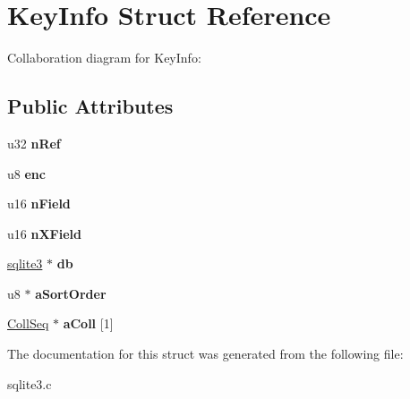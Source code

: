 \hypertarget{structKeyInfo}{}\section{Key\+Info Struct Reference}
\label{structKeyInfo}


Collaboration diagram for Key\+Info\+:
\subsection*{Public Attributes}
\begin{DoxyCompactItemize}
\item 
u32 {\bfseries n\+Ref}\hypertarget{structKeyInfo_a4f6162c8d1ecc9e3c7471571e8918972}{}\label{structKeyInfo_a4f6162c8d1ecc9e3c7471571e8918972}

\item 
u8 {\bfseries enc}\hypertarget{structKeyInfo_a37972825f9a148668e979be12465e832}{}\label{structKeyInfo_a37972825f9a148668e979be12465e832}

\item 
u16 {\bfseries n\+Field}\hypertarget{structKeyInfo_af70436487a95e445d540bfc4ca1d3f0b}{}\label{structKeyInfo_af70436487a95e445d540bfc4ca1d3f0b}

\item 
u16 {\bfseries n\+X\+Field}\hypertarget{structKeyInfo_ac77a6b68f879a69127a8797b62a2f3aa}{}\label{structKeyInfo_ac77a6b68f879a69127a8797b62a2f3aa}

\item 
\hyperlink{structsqlite3}{sqlite3} $\ast$ {\bfseries db}\hypertarget{structKeyInfo_af2e7a3a411f5ca1ccf6de77d320b59db}{}\label{structKeyInfo_af2e7a3a411f5ca1ccf6de77d320b59db}

\item 
u8 $\ast$ {\bfseries a\+Sort\+Order}\hypertarget{structKeyInfo_ac5fe4bd0172a1f11f41f678528a7b21e}{}\label{structKeyInfo_ac5fe4bd0172a1f11f41f678528a7b21e}

\item 
\hyperlink{structCollSeq}{Coll\+Seq} $\ast$ {\bfseries a\+Coll} \mbox{[}1\mbox{]}\hypertarget{structKeyInfo_ad43aa024fca5a065e75d8e24b231adcb}{}\label{structKeyInfo_ad43aa024fca5a065e75d8e24b231adcb}

\end{DoxyCompactItemize}


The documentation for this struct was generated from the following file\+:\begin{DoxyCompactItemize}
\item 
sqlite3.\+c\end{DoxyCompactItemize}
